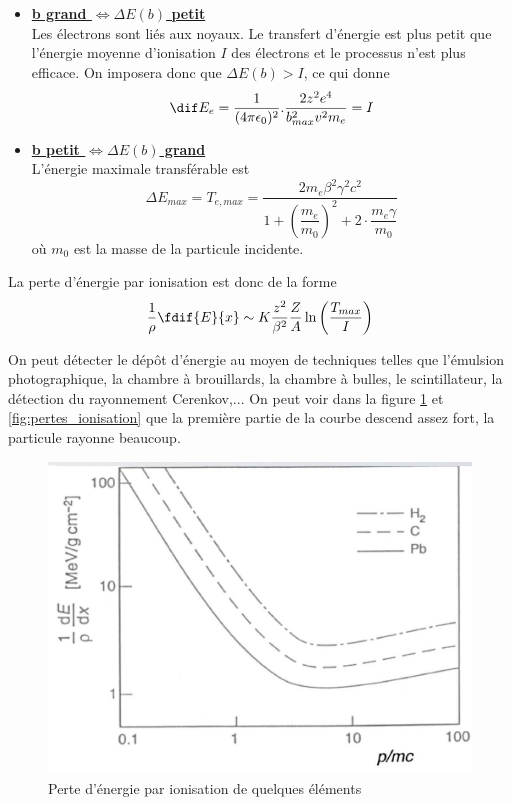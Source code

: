 \begin{itemize}[label=$\rightarrow$]
    \item \underline{\textbf{b grand $\Leftrightarrow\Delta E(b)$ petit}}\\[0,2cm]
    Les électrons sont liés aux noyaux. Le transfert d'énergie est plus petit que l'énergie moyenne d'ionisation $I$ des électrons et le processus n'est plus efficace. On imposera donc que $\Delta E(b) > I$, ce qui donne
    \[
        \dif E_e=\dfrac{1}{(4\pi \epsilon_0)^2}.\dfrac{2z^2e^4}{b_{max}^2v^2m_e}=I
    \]
    \item \underline{\textbf{b petit $\Longleftrightarrow\Delta E(b)$ grand}}\\[0,2cm]
    L'énergie maximale transférable est
        \[
            \Delta E_{max}=T_{e,max}=\dfrac{2m_e\beta^2\gamma^2c^2}{1+\left(\dfrac{m_e}{m_0}\right)^2+2\cdot\dfrac{m_e\gamma}{m_0}}
        \]
    où $m_0$ est la masse de la particule incidente.
\end{itemize}
La perte d'énergie par ionisation est donc de la forme
\[
    \dfrac{1}{\rho}\fdif{E}{x} \sim K\dfrac{z^2}{\beta^2}\dfrac{Z}{A}  \ln{\left(\dfrac{T_{max}}{I}\right)}
\]

On peut détecter le dépôt d'énergie au moyen de techniques telles que l'émulsion photographique, la chambre à brouillards, la chambre à bulles, le scintillateur, la détection du rayonnement Cerenkov,...
On peut voir dans la figure \ref{fig:perte_energie} et \ref{fig:pertes_ionisation} que la première partie de la courbe descend assez fort, la particule rayonne beaucoup.

\begin{figure}[ht]
    \centering
    \includegraphics[scale=0.60]{Images1/perteenergie.PNG}
    \caption{Perte d'énergie par ionisation de quelques éléments}
    \label{fig:perte_energie}
\end{figure}

